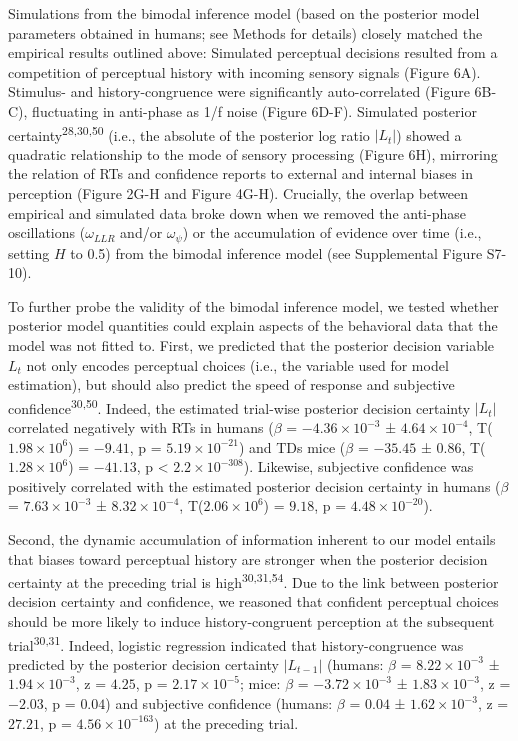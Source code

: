 \documentclass[
]{article}
\begin{document}
Simulations from the bimodal inference model (based on the posterior
model parameters obtained in humans; see Methods for details) closely
matched the empirical results outlined above: Simulated perceptual
decisions resulted from a competition of perceptual history with
incoming sensory signals (Figure 6A). Stimulus- and history-congruence
were significantly auto-correlated (Figure 6B-C), fluctuating in
anti-phase as 1/f noise (Figure 6D-F). Simulated posterior
certainty\textsuperscript{28,30,50} (i.e., the absolute of the posterior
log ratio \(|L_t|\)) showed a quadratic relationship to the mode of
sensory processing (Figure 6H), mirroring the relation of RTs and
confidence reports to external and internal biases in perception (Figure
2G-H and Figure 4G-H). Crucially, the overlap between empirical and
simulated data broke down when we removed the anti-phase oscillations
(\(\omega_{LLR}\) and/or \(\omega_{\psi}\)) or the accumulation of
evidence over time (i.e., setting \(H\) to 0.5) from the bimodal
inference model (see Supplemental Figure S7-10).

To further probe the validity of the bimodal inference model, we tested
whether posterior model quantities could explain aspects of the
behavioral data that the model was not fitted to. First, we predicted
that the posterior decision variable \(L_t\) not only encodes perceptual
choices (i.e., the variable used for model estimation), but should also
predict the speed of response and subjective
confidence\textsuperscript{30,50}. Indeed, the estimated trial-wise
posterior decision certainty \(|L_t|\) correlated negatively with RTs in
humans (\(\beta\) = \(\ensuremath{-4.36\times 10^{-3}}\) ±
\(\ensuremath{4.64\times 10^{-4}}\),
T(\(\ensuremath{1.98\times 10^{6}}\)) = \(-9.41\), p =
\(\ensuremath{5.19\times 10^{-21}}\)) and TDs mice (\(\beta\) =
\(-35.45\) ± \(0.86\), T(\(\ensuremath{1.28\times 10^{6}}\)) =
\(-41.13\), p < \(\ensuremath{2.2\times 10^{-308}}\)). Likewise, subjective confidence was positively
correlated with the estimated posterior decision certainty in humans
(\(\beta\) = \(\ensuremath{7.63\times 10^{-3}}\) ±
\(\ensuremath{8.32\times 10^{-4}}\),
T(\(\ensuremath{2.06\times 10^{6}}\)) = \(9.18\), p =
\(\ensuremath{4.48\times 10^{-20}}\)).

Second, the dynamic accumulation of information inherent to our model
entails that biases toward perceptual history are stronger when the
posterior decision certainty at the preceding trial is
high\textsuperscript{30,31,54}. Due to the link between posterior
decision certainty and confidence, we reasoned that confident perceptual
choices should be more likely to induce history-congruent perception at
the subsequent trial\textsuperscript{30,31}. Indeed, logistic regression
indicated that history-congruence was predicted by the posterior
decision certainty \(|L_{t-1}|\) (humans: \(\beta\) =
\(\ensuremath{8.22\times 10^{-3}}\) ±
\(\ensuremath{1.94\times 10^{-3}}\), z = \(4.25\), p =
\(\ensuremath{2.17\times 10^{-5}}\); mice: \(\beta\) =
\(\ensuremath{-3.72\times 10^{-3}}\) ±
\(\ensuremath{1.83\times 10^{-3}}\), z = \(-2.03\), p = \(0.04\)) and
subjective confidence (humans: \(\beta\) = \(0.04\) ±
\(\ensuremath{1.62\times 10^{-3}}\), z = \(27.21\), p =
\(\ensuremath{4.56\times 10^{-163}}\)) at the preceding trial.
\end{document}
